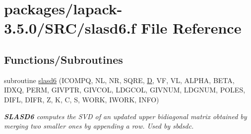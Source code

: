 \hypertarget{slasd6_8f}{}\section{packages/lapack-\/3.5.0/\+S\+R\+C/slasd6.f File Reference}
\label{slasd6_8f}
\subsection*{Functions/\+Subroutines}
\begin{DoxyCompactItemize}
\item 
subroutine \hyperlink{group__auxOTHERauxiliary_ga49655eb79b1745feabd7e9069f05e485}{slasd6} (I\+C\+O\+M\+P\+Q, N\+L, N\+R, S\+Q\+R\+E, \hyperlink{odrpack_8h_a7dae6ea403d00f3687f24a874e67d139}{D}, V\+F, V\+L, A\+L\+P\+H\+A, B\+E\+T\+A, I\+D\+X\+Q, P\+E\+R\+M, G\+I\+V\+P\+T\+R, G\+I\+V\+C\+O\+L, L\+D\+G\+C\+O\+L, G\+I\+V\+N\+U\+M, L\+D\+G\+N\+U\+M, P\+O\+L\+E\+S, D\+I\+F\+L, D\+I\+F\+R, Z, K, C, S, W\+O\+R\+K, I\+W\+O\+R\+K, I\+N\+F\+O)
\begin{DoxyCompactList}\small\item\em {\bfseries S\+L\+A\+S\+D6} computes the S\+V\+D of an updated upper bidiagonal matrix obtained by merging two smaller ones by appending a row. Used by sbdsdc. \end{DoxyCompactList}\end{DoxyCompactItemize}
